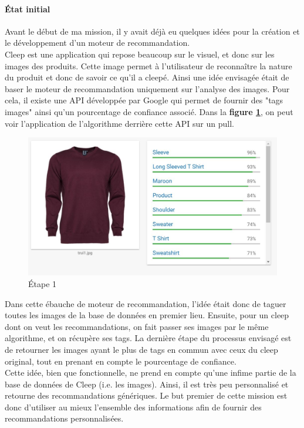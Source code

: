 \documentclass{article} %
\begin{document}
\paragraph{État initial}
Avant le début de ma mission, il y avait déjà eu quelques idées pour la création et le développement d'un moteur de recommandation.\\
Cleep est une application qui repose beaucoup sur le visuel, et donc sur les images des produits. Cette image permet à l'utilisateur de reconnaître la nature du produit et donc de savoir ce qu'il a cleepé. Ainsi une idée envisagée était de baser le moteur de recommandation uniquement sur l'analyse des images. Pour cela, il existe une API développée par Google qui permet de fournir des "tags images" ainsi qu'un pourcentage de confiance associé. Dans la \textbf{figure \ref{fig:ggviz}}, on peut voir l'application de l'algorithme derrière cette API sur un pull.\\

\begin{figure}[!h]
 \centering
 \includegraphics[keepaspectratio = true,scale=0.4]{ggvision.jpg}
 \caption{Étape 1}
 \label{fig:ggviz}
\end{figure}

Dans cette ébauche de moteur de recommandation, l'idée était donc de taguer toutes les images de la base de données en premier lieu. Ensuite, pour un cleep dont on veut les recommandations, on fait passer ses images par le même algorithme, et on récupère ses tags. La dernière étape du processus envisagé est de retourner les images ayant le plus de tags en commun avec ceux du cleep original, tout en prenant en compte le pourcentage de confiance.\\
Cette idée, bien que fonctionnelle, ne prend en compte qu'une infime partie de la base de données de Cleep (i.e. les images). Ainsi, il est très peu personnalisé et retourne des recommandations génériques. Le but premier de cette mission est donc d'utiliser au mieux l'ensemble des informations afin de fournir des recommandations personnalisées.
\end{document}
